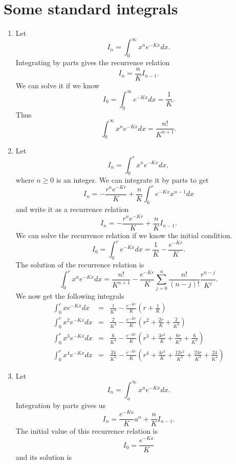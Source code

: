 \documentclass{article}
\numberwithin{equation}{section}
\begin{document}
\section{Some standard integrals}\label{a}
\begin{enumerate}
\item Let
\[
I_n = \int_0^\infty x^n e^{-Kx}dx.
\]
Integrating by parts gives the recurrence relation
\[
I_n = \frac{n}{K}I_{n-1}.
\]
We can solve it if we know 
\[
I_0 = \int_0^\infty e^{-Kx}dx = \frac{1}{K}.
\]
Thus
\begin{equation}\label{a1e1}
\int_0^\infty x^n e^{-Kx}dx = \frac{n!}{K^{n+1}}.
\end{equation}

\item Let
\[
I_n = \int_0^r x^n e^{-Kx}dx,
\]
where $n \ge 0$ is an integer.  We can integrate it by parts to get 
\[
I_n = -\frac{r^n e^{-Kr}}{K} + \frac{n}{K}\int_0^r e^{-Kx}x^{n-1}dx
\]
and write it as a recurrence relation
\[
I_n = -\frac{r^n e^{-Kr}}{K} + \frac{n}{K}I_{n-1}.
\]
We can solve the recurrence relation if we know the initial condition.
\[
I_0 = \int_0^r e^{-Kx}dx = \frac{1}{K} - \frac{e^{-Kr}}{K}.
\]
The solution of the recurrence relation is
\begin{equation}\label{a1e2}
\int_0^r x^n e^{-Kx}dx = \frac{n!}{K^{n+1}} - \frac{e^{-Kr}}{K}
\sum_{j=0}^n\frac{n!}{(n-j)!}\frac{r^{n-j}}{K^j}.
\end{equation}
We now get the following integrals
\begin{eqnarray}
\int_0^r xe^{-Kx}dx &=& \frac{1}{K^2} - 
         \frac{e^{-Kr}}{K}\left(r + \frac{1}{K}\right) \label{a1e3} \\
\int_0^r x^2e^{-Kx}dx  &=& \frac{2}{K^3} - \frac{e^{-Kr}}{K}\left(r^2 + 
	\frac{2r}{K} + \frac{2}{K^2}\right) \label{a1e4} \\
\int_0^r x^3e^{-Kx}dx  &=& \frac{6}{K^4} - \frac{e^{-Kr}}{K}\left(r^3 + 
	\frac{3r^2}{K}+\frac{6r}{K^2}+\frac{6}{K^3}\right) \label{a1e5} \\
\int_0^r x^4e^{-Kx}dx  &=& \frac{24}{K^5} - \frac{e^{-Kr}}{K}\left(r^4 + 
	\frac{4r^3}{K} + 
	\frac{12r^2}{K^2} + \frac{24r}{K^3} + \frac{24}{K^4}\right)
        \label{a1e6}
\end{eqnarray}
\item Let
\[
I_n = \int_a^\infty x^n e^{-Kx}dx.
\]
Integration by parts gives us
\[
I_n = \frac{e^{-Ka}}{K}a^n + \frac{n}{K}I_{n-1}.
\]
The initial value of this recurrence relation is
\[
I_0 = \frac{e^{-Ka}}{K}
\]
and its solution is
\begin{equation}\label{a1e7}

\end{equation}
\end{enumerate}
\end{document}
